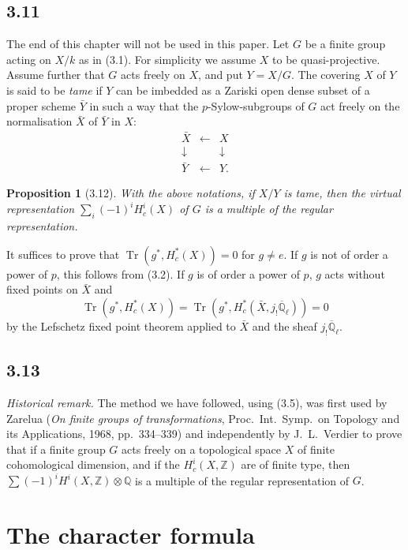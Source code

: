 \documentclass[11pt]{amsart}
\theoremstyle{plain}
\newtheorem{proposition}[theorem]{Proposition}
\theoremstyle{remark}
\DeclareMathOperator{\Tr}{Tr}
\begin{document}
\subsection{3.11} The end of this chapter will not be used in this paper. Let $G$ be a finite group acting on $X/k$ as in (3.1). For simplicity we assume $X$ to be quasi-projective. Assume further that $G$ acts freely on $X$, and put $Y = X/G$. The covering $X$ of $Y$ is said to be \textit{tame} if $Y$ can be imbedded as a Zariski open dense subset of a proper scheme $\bar{Y}$ in such a way that the $p$-Sylow-subgroups of $G$ act freely on the normalisation $\bar{X}$ of $\bar{Y}$ in $X$:
\[
\begin{array}{ccc}
\bar{X} & \longleftarrow & X \\
\downarrow & & \downarrow \\
\bar{Y} & \longleftarrow & Y.
\end{array}
\]

\begin{proposition}[3.12]
With the above notations, if $X/Y$ is tame, then the virtual representation $\sum_i (-1)^i H_c^i(X)$ of $G$ is a multiple of the regular representation.
\end{proposition}

It suffices to prove that $\Tr(g^*, H_c^*(X)) = 0$ for $g \neq e$. If $g$ is not of order a power of $p$, this follows from (3.2). If $g$ is of order a power of $p$, $g$ acts without fixed points on $\bar{X}$ and
\[
\Tr(g^*, H_c^*(X)) = \Tr(g^*, H_c^*(\bar{X}, j_!\overline{\mathbb{Q}}_\ell)) = 0
\]
by the Lefschetz fixed point theorem applied to $\bar{X}$ and the sheaf $j_!\overline{\mathbb{Q}}_\ell$.

\subsection{3.13} \textit{Historical remark.} The method we have followed, using (3.5), was first used by Zarelua (\textit{On finite groups of transformations}, Proc.\ Int.\ Symp.\ on Topology and its Applications, 1968, pp.\ 334--339) and independently by J.\ L.\ Verdier to prove that if a finite group $G$ acts freely on a topological space $X$ of finite cohomological dimension, and if the $H_c^i(X, \mathbb{Z})$ are of finite type, then $\sum (-1)^i H^i(X, \mathbb{Z}) \otimes \mathbb{Q}$ is a multiple of the regular representation of $G$.

\section{The character formula}
\end{document}
